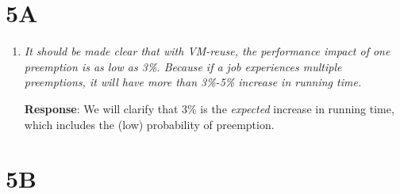 \documentclass{article}
\newcommand{\resp}[1]{\textbf{Response}: #1}
\newcommand{\revmade}[1]{\textbf{Revision Made}: #1}
\begin{document}
\section{5A}

\begin{enumerate}

\item \emph{It should be made clear that with VM-reuse, the performance impact of one preemption is as low as 3\%. Because if a job experiences multiple preemptions, it will have more than 3\%-5\% increase in running time.}

\resp{We will clarify that 3\% is the \emph{expected} increase in running time, which includes the (low) probability of preemption.  }


\end{enumerate}

\section{5B}
\end{document}
